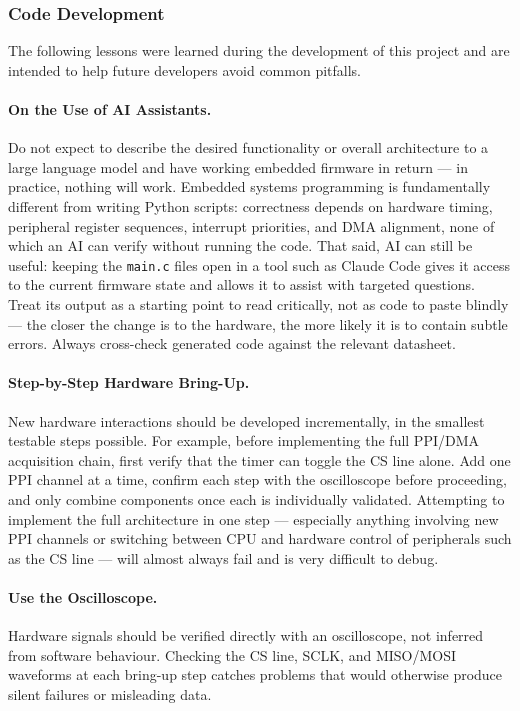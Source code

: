 \subsubsection{Code Development}

The following lessons were learned during the development of this project and are
intended to help future developers avoid common pitfalls.

\paragraph{On the Use of AI Assistants.}
Do not expect to describe the desired functionality or overall architecture to a
large language model and have working embedded firmware in return --- in practice,
nothing will work. Embedded systems programming is fundamentally different from
writing Python scripts: correctness depends on hardware timing, peripheral register
sequences, interrupt priorities, and DMA alignment, none of which an AI can verify
without running the code. That said, AI can still be useful: keeping the
\texttt{main.c} files open in a tool such as Claude Code gives it access to the
current firmware state and allows it to assist with targeted questions. Treat its
output as a starting point to read critically, not as code to paste blindly --- the
closer the change is to the hardware, the more likely it is to contain subtle
errors. Always cross-check generated code against the relevant datasheet.

\paragraph{Step-by-Step Hardware Bring-Up.}
New hardware interactions should be developed incrementally, in the smallest
testable steps possible. For example, before implementing the full PPI/DMA
acquisition chain, first verify that the timer can toggle the CS line alone. Add
one PPI channel at a time, confirm each step with the oscilloscope before
proceeding, and only combine components once each is individually validated.
Attempting to implement the full architecture in one step --- especially anything
involving new PPI channels or switching between CPU and hardware control of
peripherals such as the CS line --- will almost always fail and is very difficult
to debug.

\paragraph{Use the Oscilloscope.}
Hardware signals should be verified directly with an oscilloscope, not inferred
from software behaviour. Checking the CS line, SCLK, and MISO/MOSI waveforms
at each bring-up step catches problems that would otherwise produce silent failures
or misleading data.

